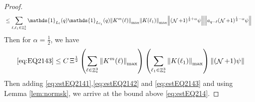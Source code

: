 \documentclass[sn-mathphys, Numbered ,a4paper]{sn-jnl}%
\DeclareMathOperator{\Z}{\mathbb{Z}}
\DeclareMathOperator{\NN}{\mathcal{N}}
\newcommand{\half}{\frac{1}{2}}
\theoremstyle{plain}
\theoremstyle{definition}
\theoremstyle{remark}
\theoremstyle{plain}
\theoremstyle{definition}
\theoremstyle{remark}
\begin{document}
{\begin{proof}
\begin{align}
		&\leq \sum\limits_{\ell, \ell_1\in \Z^3_*} \mathds{1}_{L_{\ell}}(q) \mathds{1}_{L_{\ell_1}}(q) \norm{K^m{(\ell)}}_{\mathrm{max}} \norm{K(\ell_1)}_{\mathrm{max}} \norm{   (\NN+1)^{\half+\alpha}\psi} \norm{ a_{q-\ell} (\NN+1)^{\half-\alpha} \psi } \nonumber
	\end{align} 
	Then for $\alpha = \half$, we have
	\begin{equation}
		\eqref{eq:EQ2143}\leq C\, \Xi^\half \left(\sum\limits_{\ell\in \Z^3_*} \norm{K^m(\ell)}_{\mathrm{max}}\right)\left(  \sum\limits_{ \ell_1\in \Z^3_*}  \norm{ K(\ell_1)}_{\mathrm{max}} \right) \norm{ (\NN+1) \psi}\label{eq:estEQ2143} 
	\end{equation}
	Then adding \eqref{eq:estEQ2141},\eqref{eq:estEQ2142} and \eqref{eq:estEQ2143} and using Lemma \ref{lem:normsk}, we arrive at the bound above \eqref{eq:estEQ214}.
\end{proof}}
\end{document}
